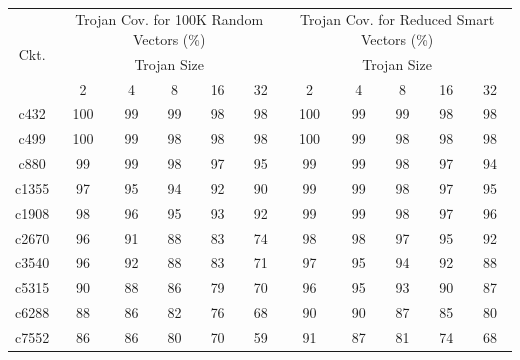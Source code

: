 \begin{latin}

\begin{table}[h]
	\begin{tabular}{|c|c|c|c|c|c|c|c|c|c|c|}
		\hline
		\multirow{3}{*}{Ckt.} & \multicolumn{5}{c|}{Trojan Cov. for 100K Random Vectors (\%)} & \multicolumn{5}{c|}{Trojan Cov. for Reduced Smart Vectors (\%)} \\ \cline{2-11} 
		& \multicolumn{5}{c|}{Trojan Size}                              & \multicolumn{5}{c|}{Trojan Size}                                \\ \cline{2-11} 
		& 2           & 4          & 8          & 16        & 32        & 2           & 4          & 8          & 16         & 32         \\ \hline
		c432                  & 100         & 99         & 99         & 98        & 98        & 100         & 99         & 99         & 98         & 98         \\ \hline
		c499                  & 100         & 99         & 98         & 98        & 98        & 100         & 99         & 98         & 98         & 98         \\ \hline
		c880                  & 99          & 99         & 98         & 97        & 95        & 99          & 99         & 98         & 97         & 94         \\ \hline
		c1355                 & 97          & 95         & 94         & 92        & 90        & 99          & 99         & 98         & 97         & 95         \\ \hline
		c1908                 & 98          & 96         & 95         & 93        & 92        & 99          & 99         & 98         & 97         & 96         \\ \hline
		c2670                 & 96          & 91         & 88         & 83        & 74        & 98          & 98         & 97         & 95         & 92         \\ \hline
		c3540                 & 96          & 92         & 88         & 83        & 71        & 97          & 95         & 94         & 92         & 88         \\ \hline
		c5315                 & 90          & 88         & 86         & 79        & 70        & 96          & 95         & 93         & 90         & 87         \\ \hline
		c6288                 & 88          & 86         & 82         & 76        & 68        & 90          & 90         & 87         & 85         & 80         \\ \hline
		c7552                 & 86          & 86         & 80         & 70        & 59        & 91          & 87         & 81         & 74         & 68         \\ \hline
	\end{tabular}
	\caption{}
\end{table}
\end{latin}

